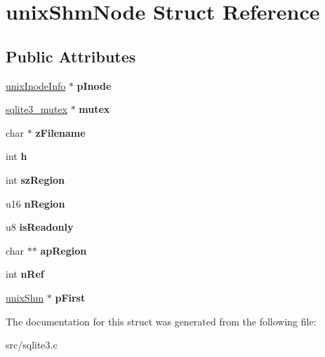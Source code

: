 \hypertarget{structunix_shm_node}{\section{unix\-Shm\-Node Struct Reference}
\label{structunix_shm_node}
}
\subsection*{Public Attributes}
\begin{DoxyCompactItemize}
\item 
\hypertarget{structunix_shm_node_ab6bc1cf84d65887a3395da6406843817}{\hyperlink{structunix_inode_info}{unix\-Inode\-Info} $\ast$ {\bfseries p\-Inode}}\label{structunix_shm_node_ab6bc1cf84d65887a3395da6406843817}

\item 
\hypertarget{structunix_shm_node_aa90850530f48fec6f2a872874f8ddf1f}{\hyperlink{structsqlite3__mutex}{sqlite3\-\_\-mutex} $\ast$ {\bfseries mutex}}\label{structunix_shm_node_aa90850530f48fec6f2a872874f8ddf1f}

\item 
\hypertarget{structunix_shm_node_a188c3bc5fcb4666ad0817ac093e7505d}{char $\ast$ {\bfseries z\-Filename}}\label{structunix_shm_node_a188c3bc5fcb4666ad0817ac093e7505d}

\item 
\hypertarget{structunix_shm_node_a9cd93c8052eb47f257e2d752e8f1fdba}{int {\bfseries h}}\label{structunix_shm_node_a9cd93c8052eb47f257e2d752e8f1fdba}

\item 
\hypertarget{structunix_shm_node_ae8126f9db70a758c2f340ec06869e02b}{int {\bfseries sz\-Region}}\label{structunix_shm_node_ae8126f9db70a758c2f340ec06869e02b}

\item 
\hypertarget{structunix_shm_node_aaf1fceb640b3959424403885c0419a46}{u16 {\bfseries n\-Region}}\label{structunix_shm_node_aaf1fceb640b3959424403885c0419a46}

\item 
\hypertarget{structunix_shm_node_ad241b0a85f01110310cea91aa38fccb2}{u8 {\bfseries is\-Readonly}}\label{structunix_shm_node_ad241b0a85f01110310cea91aa38fccb2}

\item 
\hypertarget{structunix_shm_node_a8eff550f9b10a2de463e9874f84efc5e}{char $\ast$$\ast$ {\bfseries ap\-Region}}\label{structunix_shm_node_a8eff550f9b10a2de463e9874f84efc5e}

\item 
\hypertarget{structunix_shm_node_a6d9f0c9dec3f6710cb09c90723a8284b}{int {\bfseries n\-Ref}}\label{structunix_shm_node_a6d9f0c9dec3f6710cb09c90723a8284b}

\item 
\hypertarget{structunix_shm_node_a0ddd6c4625acf5994a60b0c368bc665e}{\hyperlink{structunix_shm}{unix\-Shm} $\ast$ {\bfseries p\-First}}\label{structunix_shm_node_a0ddd6c4625acf5994a60b0c368bc665e}

\end{DoxyCompactItemize}


The documentation for this struct was generated from the following file\-:\begin{DoxyCompactItemize}
\item 
src/sqlite3.\-c\end{DoxyCompactItemize}
